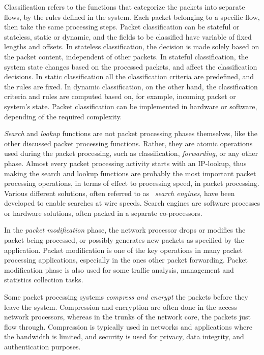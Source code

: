 Classification refers to the functions that categorize the packets into separate flows, by the rules defined in the system. Each packet belonging to a specific flow, then take the same processing steps. Packet classification can be stateful or stateless, static or dynamic, and the fields to be classified have variable of fixed lengths and offsets. In stateless classification, the decision is made solely based on the packet content, independent of other packets. In stateful classification, the system state changes based on the processed packets, and affect the classification decisions. In static classification all the classification criteria are predefined, and the rules are fixed. In dynamic classification, on the other hand, the classification criteria and rules are computed based on, for example, incoming packet or system's state. Packet classification can be implemented in hardware or software, depending of the required complexity.~\cite{Giladi:2008:Network}

\emph{Search} and \emph{lookup} functions are not packet processing phases themselves, like the other discussed packet processing functions. Rather, they are atomic operations used during the packet processing, such as classification, \emph{forwarding}, or any other phase. Almost every packet processing activity starts with an IP-lookup, thus making the search and lookup functions are probably the most important packet processing operations, in terms of effect to processing speed, in packet processing. Various different solutions, often referred to as ~\emph{search engines}, have been developed to enable searches at wire speeds. Search engines are software processes or hardware solutions, often packed in a separate co-processors.~\cite{Giladi:2008:Network}


In the \emph{packet modification} phase, the network processor drops or modifies the packet being processed, or possibly generates new packets as specified by the application. Packet modification is one of the key operations in many packet processing applications, especially in the ones other packet forwarding. Packet modification phase is also used for some traffic analysis, management and statistics collection tasks.~\cite{Giladi:2008:Network}

Some packet processing systems \emph{compress and encrypt} the packets before they leave the system. Compression and encryption are often done in the access network processors, whereas in the trunks of the network core, the packets just flow through. Compression is typically used in networks and applications where the bandwidth is limited, and security is used for privacy, data integrity, and authentication purposes.~\cite{Giladi:2008:Network}

